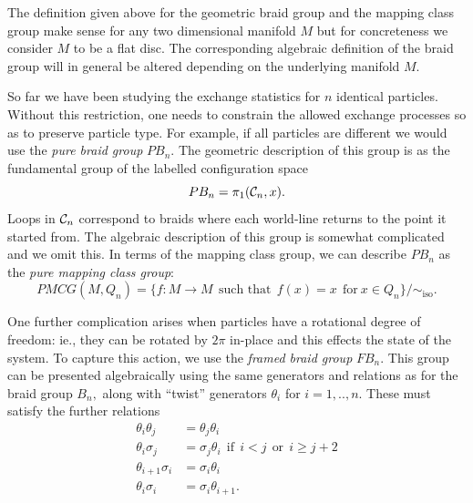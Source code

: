 \documentclass[aps, tightenlines, letterpaper, onecolumn, superscriptaddress, notitlepage, 11pt, groupedaddress]{revtex4-1}
\begin{document}

The definition given above for the geometric braid group
and the mapping class group make sense for any two dimensional
manifold $M$ but for concreteness we consider $M$ to be
a flat disc. 
The corresponding algebraic definition of the braid group
will in general be altered depending on the underlying manifold
$M.$

So far we have been studying the exchange statistics
for $n$ identical particles. Without this restriction, one needs to
constrain the allowed exchange processes so as to preserve particle type.
For example, if all particles are different we would use the
\emph{pure braid group} $PB_n.$
The geometric description of
this group is as the fundamental group of the labelled
configuration space
$$
    PB_n = \pi_1 ( \mathcal{C}_n, x ).
$$
Loops in $\mathcal{C}_n$ correspond to braids where each world-line returns
to the point it started from.
The algebraic description of this group is somewhat complicated and
we omit this.
In terms of the mapping class group, we can describe $PB_n$
as the \emph{pure mapping class group}:
$$
    PMCG(M, Q_n) = \{ f : M \to M \ \ \mbox{such that}\ \ f(x)=x \ \ \mbox{for}\ x\in Q_n\} / \sim_{\mbox{iso}}.
$$

One further complication arises when particles have a rotational
degree of freedom: ie., they can be rotated by $2\pi$ in-place and
this effects the state of the system.
To capture this action, we use the \emph{framed braid group} $FB_n.$
This group can be presented algebraically using the same generators
and relations as for the braid group $B_n,$ along with
``twist'' generators $\theta_i$ for $i=1,..,n.$
These must satisfy the further relations
\begin{align*}
    \theta_i \theta_j &= \theta_j \theta_i \\
    \theta_i\sigma_j &= \sigma_j\theta_i 
    \ \ \mbox{if}\ \ i<j \ \ \mbox{or}\ \ i\ge j+2\\
    \theta_{i+1}\sigma_i &= \sigma_i\theta_i \\
    \theta_{i}\sigma_i &= \sigma_i\theta_{i+1}.
\end{align*}
\end{document}
